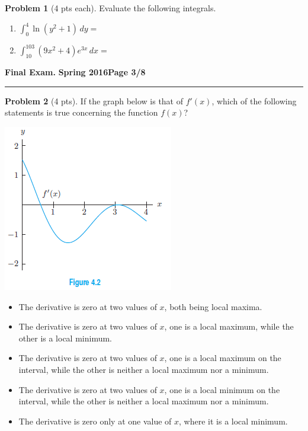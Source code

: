 \documentclass[12pt]{article}
\makeatletter
\theoremstyle{definition}
\newtheorem{problem}{Problem}
\newcommand*{\radiobutton}{%
  \@ifstar{\@radiobutton0}{\@radiobutton1}%
}
\newcommand*{\@radiobutton}[1]{%
  \begin{tikzpicture}
    \pgfmathsetlengthmacro\radius{height("X")/2}
    \draw[radius=\radius] circle;
    \ifcase#1 \fill[radius=.6*\radius] circle;\fi
  \end{tikzpicture}%
}
\makeatother
\begin{document}
\begin{problem}[4 pts each]
Evaluate the following integrals.
\begin{enumerate}
\item $\displaystyle{\int_{0}^{4} \ln(y^2 + 1) \, dy} = $
\item $\displaystyle{\int_{10}^{103} (9x^2+4)e^{3x}\, dx = }$
\vspace{7cm}
\end{enumerate}
\end{problem}

\newpage

\hfill{\large\bf Final Exam.}\hfill{\large\bf
  Spring 2016}\hfill{\large\bf Page 3/8}\hrule

\bigskip

\begin{problem}[4 pts]
If the graph below is that of $f'(x)$, which of the following statements is true concerning the function $f(x)$?
\begin{multicols}{2}
\includegraphics{3graph2}
\vspace{2cm}

\begin{itemize}
\item[\radiobutton] The derivative is zero at two values of $x$, both being local maxima.
\item[\radiobutton] The derivative is zero at two values of $x$, one is a local maximum, while the other is a local minimum.
\item[\radiobutton] The derivative is zero at two values of $x$, one is a local maximum on the interval, while the other is neither a local maximum nor a minimum.
\item[\radiobutton] The derivative is zero at two values of $x$, one is a local minimum on the interval, while the other is neither a local maximum nor a minimum.
\item[\radiobutton] The derivative is zero only at one value of $x$, where it is a local minimum.
\end{itemize}
\end{multicols}
\end{problem}
\end{document}
